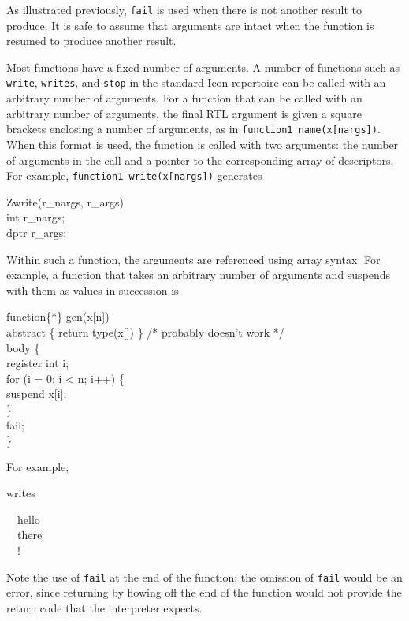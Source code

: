 \noindent
As illustrated previously, \texttt{fail} is used when there is not another
result to produce. It is safe to assume that arguments
are intact when the function is resumed to produce another result.

Most functions have a fixed number of arguments. A number of
functions such as \texttt{write}, \texttt{writes},
and \texttt{stop} in the standard Icon repertoire can be called with an
arbitrary number of arguments. For a function that can be called with
an arbitrary number of arguments, the final RTL argument is given a
square brackets enclosing a number of arguments, as in
\texttt{function{1} name(x[nargs])}. When this format is used, the function is
called with two arguments: the number of arguments in the call and a
pointer to the corresponding array of descriptors. For example,
\texttt{function{1} write(x[nargs])} generates

\goodbreak
\begin{iconcode}
Zwrite(r\_nargs, r\_args)\\
int r\_nargs;\\
dptr r\_args;
\end{iconcode}

Within such a function,
the arguments are referenced using array syntax. For example, a
function that takes an arbitrary number of arguments and suspends with
them as values in succession is

\goodbreak
\begin{iconcode}
function\{*\} gen(x[n])\\
{\color{red} abstract \{ return type(x[]) \} /* probably doesn't work */ } \\
body \{\\
\>register int i;\\
\>for (i = 0; i < n; i++) \{\\
\>\>suspend x[i];\\
\>\}\\
\>fail;\\
\}
\end{iconcode}

\noindent
For example,

\noindent
writes

\goodbreak
\begin{iconcode}
\ \ hello\\
\ \ there\\
\ \ !
\end{iconcode}

\noindent
Note the use of \texttt{fail} at the end of the function; the omission of
\texttt{fail} would be an error, since returning by flowing off the end of the
function would not provide the return code that the interpreter expects.

